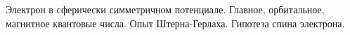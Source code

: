 \documentclass[__main__.tex]{subfiles}
\begin{document}
Электрон в сферически симметричном потенциале. Главное, орбитальное, магнитное квантовые числа. Опыт Штерна-Герлаха. Гипотеза спина электрона.\\ 

\end{document}
